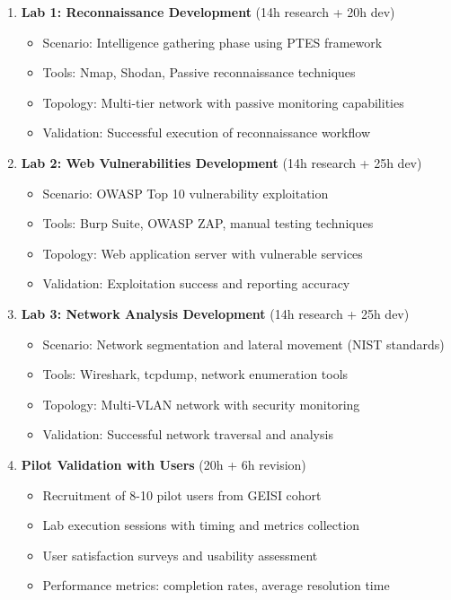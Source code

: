 \begin{enumerate}

\item \textbf{Lab 1: Reconnaissance Development} (14h research + 20h dev)
\begin{itemize}
\item Scenario: Intelligence gathering phase using PTES framework
\item Tools: Nmap, Shodan, Passive reconnaissance techniques
\item Topology: Multi-tier network with passive monitoring capabilities
\item Validation: Successful execution of reconnaissance workflow
\end{itemize}

\item \textbf{Lab 2: Web Vulnerabilities Development} (14h research + 25h dev)
\begin{itemize}
\item Scenario: OWASP Top 10 vulnerability exploitation
\item Tools: Burp Suite, OWASP ZAP, manual testing techniques
\item Topology: Web application server with vulnerable services
\item Validation: Exploitation success and reporting accuracy
\end{itemize}

\item \textbf{Lab 3: Network Analysis Development} (14h research + 25h dev)
\begin{itemize}
\item Scenario: Network segmentation and lateral movement (NIST standards)
\item Tools: Wireshark, tcpdump, network enumeration tools
\item Topology: Multi-VLAN network with security monitoring
\item Validation: Successful network traversal and analysis
\end{itemize}

\item \textbf{Pilot Validation with Users} (20h + 6h revision)
\begin{itemize}
\item Recruitment of 8-10 pilot users from GEISI cohort
\item Lab execution sessions with timing and metrics collection
\item User satisfaction surveys and usability assessment
\item Performance metrics: completion rates, average resolution time
\end{itemize}


\end{enumerate}
